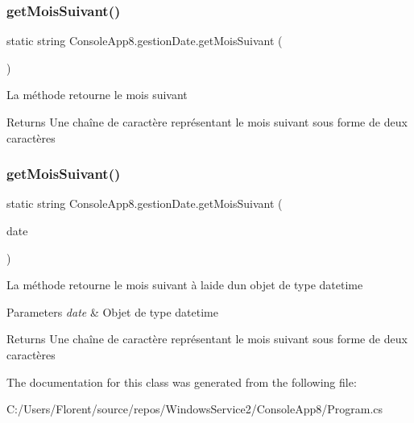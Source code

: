 \subsubsection{\texorpdfstring{get\+Mois\+Suivant()}{getMoisSuivant()}\hspace{0.1cm}{\footnotesize\ttfamily [1/2]}}
{\footnotesize\ttfamily static string Console\+App8.\+gestion\+Date.\+get\+Mois\+Suivant (\begin{DoxyParamCaption}{ }\end{DoxyParamCaption})\hspace{0.3cm}{\ttfamily [static]}}



La méthode retourne le mois suivant 

\begin{DoxyReturn}{Returns}
Une chaîne de caractère représentant le mois suivant sous forme de deux caractères
\end{DoxyReturn}
\mbox{\label{class_console_app8_1_1gestion_date_ae0f7f304fd9f44857f69b6c7fc03ef41}} 
\subsubsection{\texorpdfstring{get\+Mois\+Suivant()}{getMoisSuivant()}\hspace{0.1cm}{\footnotesize\ttfamily [2/2]}}
{\footnotesize\ttfamily static string Console\+App8.\+gestion\+Date.\+get\+Mois\+Suivant (\begin{DoxyParamCaption}\item[{Date\+Time}]{date }\end{DoxyParamCaption})\hspace{0.3cm}{\ttfamily [static]}}



La méthode retourne le mois suivant à l\textquotesingle{}aide d\textquotesingle{}un objet de type datetime 


\begin{DoxyParams}{Parameters}
{\em date} & Objet de type datetime\\
\hline
\end{DoxyParams}
\begin{DoxyReturn}{Returns}
Une chaîne de caractère représentant le mois suivant sous forme de deux caractères
\end{DoxyReturn}


The documentation for this class was generated from the following file\+:\begin{DoxyCompactItemize}
\item 
C\+:/\+Users/\+Florent/source/repos/\+Windows\+Service2/\+Console\+App8/Program.\+cs\end{DoxyCompactItemize}
